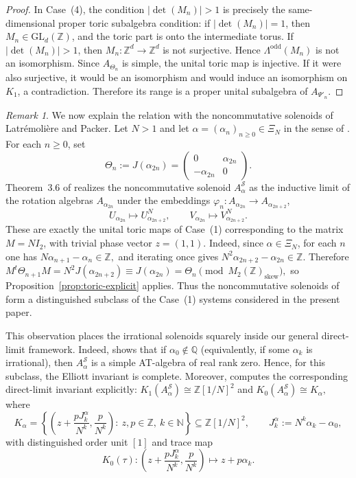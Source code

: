 \documentclass[11pt]{amsart}
\theoremstyle{definition}
\theoremstyle{remark}
\newtheorem{remark}[theorem]{Remark}
\newcommand{\Z}{\mathbb{Z}}
\newcommand{\N}{\mathbb N}
\newcommand{\Q}{\mathbb Q}
\newcommand{\GL}{\mathrm{GL}}
\begin{document}
\begin{proof}
In Case~\textup{(4)}, the condition $|\det(M_n)|>1$ is precisely the
same-dimensional proper toric subalgebra condition:  if $|\det(M_n)|=1$, then
$M_n\in\GL_d(\Z)$, and the toric part is onto the intermediate torus. If $|\det(M_n)|>1$, then $M_n\colon\Z^d\to\Z^d$ is not surjective. Hence
$\Lambda^{\mathrm{odd}}(M_n)$ is not an isomorphism. Since $A_{\Theta_n}$
is simple, the unital toric map is injective. If it were also surjective, it
would be an isomorphism and would induce an isomorphism on $K_1$, a
contradiction. Therefore its range is a proper unital subalgebra of
$A_{\Psi'_n}$.
\end{proof}

\begin{remark}
\label{rem:latpack}
We now explain the relation with the noncommutative solenoids of
Latr\'emoli\`ere and Packer. Let $N>1$ and let $\alpha=(\alpha_n)_{n\ge0}\in \Xi_N$ in the sense of
\cite[Theorem~2.1]{LatPackSol}. For each $n\geq 0$, set
\[
\Theta_n:=J(\alpha_{2n})=
\begin{pmatrix}
0&\alpha_{2n}\\
-\alpha_{2n}&0
\end{pmatrix}.
\]
Theorem~3.6 of \cite{LatPackSol} realizes the noncommutative solenoid
$A_\alpha^{\mathscr S}$ as the inductive limit of the rotation algebras
$A_{\alpha_{2n}}$ under the embeddings $\varphi_n\colon A_{\alpha_{2n}}\longrightarrow A_{\alpha_{2n+2}}$,
\[U_{\alpha_{2n}}\longmapsto U^N_{\alpha_{2n+2}},\qquad V_{\alpha_{2n}}\longmapsto V^N_{\alpha_{2n+2}}.
\]
These are exactly the unital toric maps of Case~\textup{(1)} corresponding to the
matrix $M=NI_2$, with trivial phase vector $z=(1,1)$. Indeed, since
$\alpha\in\Xi_N$, for each $n$ one has $N\alpha_{n+1}-\alpha_n\in \Z,$
and iterating once gives $N^2\alpha_{2n+2}-\alpha_{2n}\in \Z.$
Therefore $M^t\Theta_{n+1}M=N^2J(\alpha_{2n+2})
\equiv
J(\alpha_{2n})=\Theta_n
\pmod{M_2(\Z)_{\mathrm{skew}}},$
so Proposition~\ref{prop:toric-explicit} applies. Thus the noncommutative
solenoids of \cite{LatPackSol} form a distinguished subclass of the Case~\textup{(1)}
systems considered in the present paper.

This observation places the irrational solenoids squarely inside our general
direct-limit framework. Indeed, \cite[Proposition~3.19]{LatPackSol} shows that
if $\alpha_0\notin\Q$ (equivalently, if some $\alpha_k$ is irrational), then
$A_\alpha^{\mathscr S}$ is a simple AT-algebra of real rank zero. Hence, for
this subclass, the Elliott invariant is complete. Moreover,
\cite[Theorem~3.7]{LatPackSol} computes the corresponding direct-limit invariant
explicitly: $K_1(A_\alpha^{\mathscr S})\cong \mathbb Z[1/N]^2$ and $K_0(A_\alpha^{\mathscr S})\cong K_\alpha,$
where
\[
K_\alpha=
\left\{
\left(z+\frac{pJ_k^\alpha}{N^k},\frac{p}{N^k}\right)
:\ z,p\in\Z,\ k\in\N
\right\}
\subseteq \mathbb Z[1/N]^2,
\qquad
J_k^\alpha:=N^k\alpha_k-\alpha_0,
\]
with distinguished order unit $[1]$ and trace map
\[
K_0(\tau)\colon
\left(z+\frac{pJ_k^\alpha}{N^k},\frac{p}{N^k}\right)
\longmapsto z+p\alpha_k.
\]


\end{remark}
\end{document}
